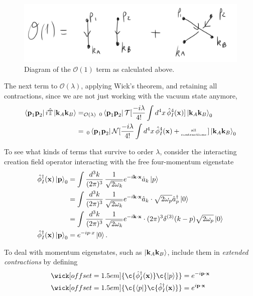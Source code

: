 \begin{figure}[H]
	\centering
	\includegraphics[scale=0.4]{images/o1.png}
	\caption{Diagram of the $\mathcal{O}(1)$ term as calculated above.}
\end{figure}

\noindent The next term to $\mathcal{O}(\lambda)$, applying Wick's theorem, and retaining all contractions, since we are not just working with the vacuum state anymore,
\begin{align}
\bra{\textbf{p}_1 \textbf{p}_2} i\hat{\mathbb{T}} \ket{\textbf{k}_A \textbf{k}_B}  &=_{\mathcal{O}(\lambda)} \,_{0}\bra{\textbf{p}_1 \textbf{p}_2} \mathcal{T}[ \frac{-i\lambda}{4!} \int d^4 x \, \hat{\phi}_I^4(\textbf{x}) ] \ket{\textbf{k}_A \textbf{k}_B}_{0} \\
&= \,_{0}\bra{\textbf{p}_1 \textbf{p}_2} \mathcal{N}[ \frac{-i\lambda}{4!} \int d^4 x \, \hat{\phi}_I^4(\textbf{x}) + {\tiny \stackanchor{all}{contractions}}\, ] \ket{\textbf{k}_A \textbf{k}_B}_{0}
\end{align}

\noindent To see what kinds of terms that survive to order $\lambda$, consider the interacting creation field operator interacting with the free four-momentum eigenstate
\begin{align}
\hat{\phi}_I^\dagger(\textbf{x}) \ket{\textbf{p}}_0 &= \int \frac{d^3 k}{(2\pi)^3} \, \frac{1}{\sqrt{2 \omega_k}} e^{-i \textbf{k}\cdot\textbf{x}} \hat{a}_k \ket{p} \\
&= \int \frac{d^3 k}{(2\pi)^3} \, \frac{1}{\sqrt{2 \omega_k}} e^{-i \textbf{k}\cdot\textbf{x}} \hat{a}_k \cdot \sqrt{2 \omega_p} \hat{a}_p^\dagger \ket{0} \\
&= \int \frac{d^3 k}{(2\pi)^3} \, \frac{1}{\sqrt{2 \omega_k}} e^{-i \textbf{k}\cdot\textbf{x}} \cdot (2\pi)^3 \delta^{(3)}(k-p) \sqrt{2\omega_p} \ket{0} \\
\hat{\phi}_I^\dagger(\textbf{x}) \ket{\textbf{p}}_0 &= e^{-i p\cdot x} \ket{0} .
\end{align}

\noindent To deal with momentum eigenstates, such as $\ket{\textbf{k}_A \textbf{k}_B}$, include them in \textit{extended contractions} by defining
\begin{align}
\wick[offset=1.5em]{\c {\hat{\phi}_I^\dagger(\textbf{x})} \c {\ket{p}} } &= e^{-i \textbf{p}\cdot \textbf{x}} \\
\wick[offset=1.5em]{\c {\bra{p}} \c {\hat{\phi}_I^\dagger(\textbf{x})}} &= e^{i \textbf{p}\cdot \textbf{x}}
\end{align}

